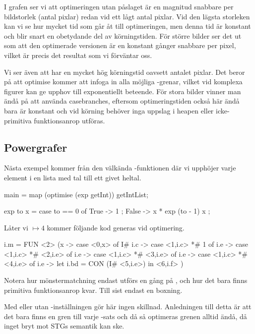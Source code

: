 \documentclass[Rapport]{subfiles}
\begin{document}
I grafen ser vi att optimeringen utan  påslaget är en
magnitud snabbare per bildstorlek (antal pixlar) redan vid ett lågt antal pixlar.
Vid den lägsta storleken kan vi se hur mycket tid som går åt till optimeringen,
men denna tid är konstant och blir snart en obetydande del av körningstiden. För
större bilder ser det ut som att den optimerade versionen är en konstant gånger
snabbare per pixel, vilket är precis det resultat som vi förväntar oss.

Vi ser även att  har en mycket hög körningstid oavsett antalet pixlar. 
Det beror på att optimise kommer att infoga in alla möjliga -grenar, 
vilket vid komplexa figurer kan ge upphov till exponentiellt beteende.
För stora bilder vinner man ändå på att använda casebranches, eftersom optimeringstiden
också här ändå bara är konstant och vid körning behöver inga uppslag i heapen eller icke-primitiva funktionsanrop utföras. 


\subsection{Powergrafer}
Nästa exempel kommer från den välkända -funktionen där vi upphöjer varje element i en lista med tal till ett givet heltal. 
\begin{codeEx}
main = map (optimise (exp getInt)) getIntList;

exp to x = case to == 0 of
    { True  -> 1
    ; False -> x * exp (to - 1) x
    };
\end{codeEx}

Låter vi  $\mapsto 4$ kommer följande kod generas vid optimering.

\begin{codeEx}
  i.m = FUN <2> (x -> case <0,x> of
    { I# i.c -> case <1,i.c> *# 1 of
       { {i.e} -> case <1,i.c> *# <2,i.e> of
          { {i.e} -> case <1,i.c> *# <3,i.e> of
             { {i.e} -> case <1,i.c> *# <4,i.e> of
                { {i.e} -> let
                   { i.bd = CON (I# <5,i.e>)
                   } in <6,i.f>
                }
             }
          }
       }
    })
\end{codeEx}

Notera hur mönstermatchning endast utförs en gång på , och hur det bara
finns primitiva funktionsanrop kvar. Till sist endast en boxning. 

Med eller utan -inställningen gör här ingen skillnad. 
Anledningen till detta är att det bara finns en gren till varje -sats
och då så optimeras grenen alltid ändå, då inget bryt mot STGs semantik kan ske.
\end{document}
